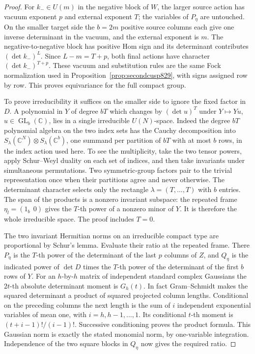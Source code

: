 \documentclass[a4paper,11pt]{article}
\theoremstyle{definition}
\theoremstyle{remark}
\numberwithin{equation}{section}
\begin{document}
\begin{proof}
For \(k_-\in U(m)\) in the negative block of \(W\), the
larger source action has vacuum exponent \(p\) and external
exponent \(T\); the variables of \(P_\eta\) are untouched.
On the smaller target side the \(b=2m\) positive source
columns each give one inverse determinant in the vacuum,
and the external exponent is \(m\). The negative-to-negative
block has positive Hom sign and its determinant contributes
\((\det k_-)^L\). Since \(L-m=T+p\), both final actions
have character \((\det k_-)^{T+p}\). These vacuum and
substitution rules are the same Fock normalization used in
Proposition~\ref{prop:secondcusp829}, with signs assigned
row by row. This proves equivariance for the full compact
group.

To prove irreducibility it suffices on the smaller side to
ignore the fixed factor in \(D\). A polynomial in \(Y\)
of degree \(bT\) which changes by \((\det u)^T\) under
\(Y\mapsto Yu\), \(u\in\operatorname{GL}_b(\mathbb C)\),
lies in a single irreducible \(U(N)\)-space. Indeed the
degree \(bT\) polynomial algebra on the two index sets has
the Cauchy decomposition into
\(S_\lambda(\mathbb C^N)\otimes S_\lambda(\mathbb C^b)\),
one summand per partition of \(bT\) with at most \(b\) rows,
in the index action used here. To see the multiplicity, take
the two tensor powers, apply Schur--Weyl duality on each
set of indices, and then take invariants under simultaneous
permutations. Two symmetric-group factors pair to the trivial
representation once when their partitions agree and never
otherwise. The determinant character selects only the
rectangle \(\lambda=(T,\ldots,T)\) with \(b\) entries.
The span of the products is a nonzero invariant subspace:
the repeated frame \(\eta_l=(1_b\ \ 0)\) gives the \(T\)-th
power of a nonzero minor of \(Y\). It is therefore the whole
irreducible space. The proof includes \(T=0\).

The two invariant Hermitian norms on an irreducible compact
type are proportional by Schur's lemma. Evaluate their
ratio at the repeated frame. There \(P_\eta\) is the \(T\)-th
power of the determinant of the last \(p\) columns of \(Z\),
and \(Q_\eta\) is the indicated power of \(\det D\) times
the \(T\)-th power of the determinant of the first \(b\)
rows of \(Y\). For an \(h\)-by-\(h\) matrix of independent
standard complex Gaussians the \(2t\)-th absolute determinant
moment is \(G_h(t)\). In fact Gram--Schmidt makes the squared
determinant a product of squared projected column lengths.
Conditional on the preceding columns the next length is the
sum of \(i\) independent exponential variables of mean one,
with \(i=h,h-1,\ldots,1\). Its conditional \(t\)-th moment
is \((t+i-1)!/(i-1)!\). Successive conditioning proves the
product formula. This Gaussian norm is exactly the stated
monomial norm, by one-variable integration. Independence of
the two square blocks in \(Q_\eta\) now gives the required
ratio.
\end{proof}
\end{document}

